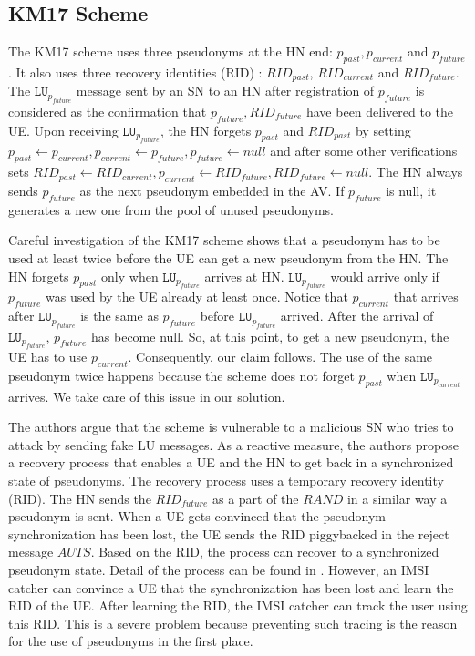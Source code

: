 \documentclass{llncs} %
\begin{document}
\subsection{KM17 Scheme} \label{sec:km17scheme}
The KM17 scheme uses three pseudonyms at the HN end: $p_{past},p_{current}$ and $p_{future}$. It also uses three recovery identities (RID) : $RID_{past}$, $RID_{current}$ and $RID_{future}$. The $\texttt{LU}_{p_{future}}$ message sent by an SN to an HN after registration of $p_{future}$ is considered as the confirmation that $p_{future}, RID_{future}$ have been delivered to the UE. Upon receiving $\texttt{LU}_{p_{future}}$, the HN forgets $p_{past}$ and $RID_{past}$ by setting $p_{past} \leftarrow p_{current}, p_{current} \leftarrow p_{future}, p_{future} \leftarrow null$ and after some other verifications sets $RID_{past} \leftarrow RID_{current}, p_{current} \leftarrow RID_{future}, RID_{future} \leftarrow null$. The HN always sends $p_{future}$ as the next pseudonym embedded in the AV. If $p_{future}$ is null, it generates a new one from the pool of unused pseudonyms.


Careful investigation of the KM17 scheme shows that a pseudonym has to be used at least twice before the UE can get a new pseudonym from the HN. The HN forgets $p_{past}$ only when $\texttt{LU}_{p_{future}}$ arrives at HN. $\texttt{LU}_{p_{future}}$ would arrive only if $p_{future}$ was used by the UE already at least once. Notice that $p_{current}$ that arrives after $\texttt{LU}_{p_{future}}$ is the same as $p_{future}$ before $\texttt{LU}_{p_{future}}$ arrived. After the arrival of $\texttt{LU}_{p_{future}}$, $p_{future}$ has become null. So, at this point, to get a new pseudonym, the UE has to use $p_{current}$. Consequently, our claim follows. The use of the same pseudonym twice happens because the scheme does not forget $p_{past}$ when $\texttt{LU}_{p_{current}}$ arrives. We take care of this issue in our solution.

The authors argue that the scheme is vulnerable to a malicious SN who tries to attack by sending fake LU messages. As a reactive measure, the authors propose a recovery process that enables a UE and the HN to get back in a synchronized state of pseudonyms. The recovery process uses a temporary recovery identity (RID). The HN sends the $RID_{future}$ as a part of the $RAND$ in a similar way a pseudonym is sent. When a UE gets convinced that the pseudonym synchronization has been lost, the UE sends the RID piggybacked in the reject message $AUTS$. Based on the RID, the process can recover to a synchronized pseudonym state. Detail of the process can be found in \cite{wisec17}. However, an IMSI catcher can convince a UE that the synchronization has been lost and learn the RID of the UE. After learning the RID, the IMSI catcher can track the user using this RID. This is a severe problem because preventing such tracing is the reason for the use of pseudonyms in the first place.
\end{document}
